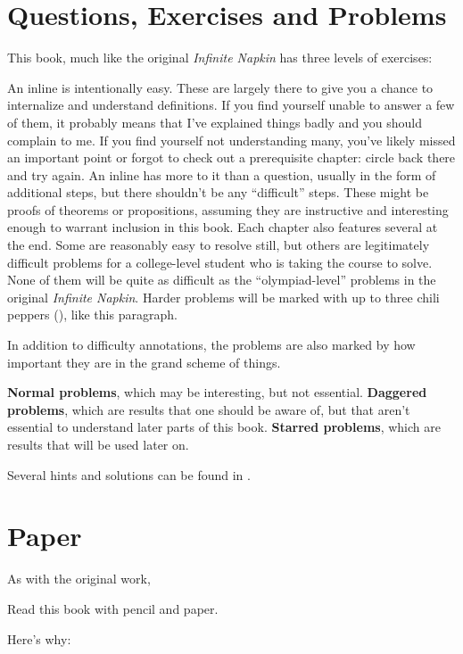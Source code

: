 \section{Questions, Exercises and Problems}
This book, much like the original \emph{Infinite Napkin\cite{ref:napkin}} has
three levels of exercises:
\begin{itemize}
  \ii{} An inline  is intentionally easy. These are largely
        there to give you a chance to internalize and understand definitions.
        If you find yourself unable to answer a few of them, it probably means
        that I've explained things badly and you should complain to me.
        If you find yourself not understanding many, you've likely missed an
        important point or forgot to check out a prerequisite chapter: circle
        back there and try again.
  \ii{} An inline  has more to it than a question, usually in
        the form of additional steps, but there shouldn't be any ``difficult''
        steps.
        These might be proofs of theorems or propositions, assuming they are
        instructive and interesting enough to warrant inclusion in this book.
  \ii{} Each chapter also features several  at the end.
        Some are reasonably easy to resolve still, but others are legitimately
        difficult problems for a college-level student who is taking the course
        to solve. None of them will be quite as difficult as the
        ``olympiad-level'' problems in the original \emph{Infinite
        Napkin\cite{ref:napkin}}.
        \onechili{} Harder problems will be marked with up to three chili peppers
        (\scalebox{0.7}{\chili}), like this paragraph.

        In addition to difficulty annotations, the problems are also marked by
        how important they are in the grand scheme of things.
        \begin{itemize}
          \ii{}\textbf{Normal problems},
          which may be interesting, but not essential.
          \ii{}\textbf{Daggered problems},
          which are results that one should be aware of, but that aren't
          essential to understand later parts of this book.
          \ii{}\textbf{Starred problems},
          which are results that will be used later on.
        \end{itemize}
\end{itemize}
Several hints and solutions can be found in .

\section{Paper}
As with the original work\cite{ref:napkin},
\begin{moral}
  Read this book with pencil and paper.
\end{moral}
Here's why:

